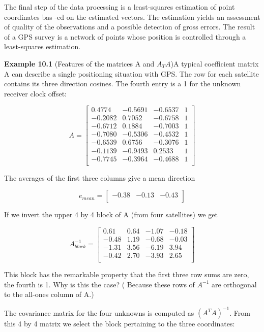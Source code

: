The final step of the data processing is a least-squares estimation of point coordinates bas
-ed on the estimated vectors. The estimation yields an assessment of quality of the observations and a possible detection of gross errors. The result of a GPS survey is a network of points whose position is controlled through a least-squares estimation.

\textbf{Example 10.1} (Features of the matrices A and $A_{T}A$)A typical coefficient matrix A can describe a single positioning situation with GPS. The row for each satellite contains its three direction cosines. The fourth entry is a 1 for the unknown receiver clock offset:

$$
A=\begin{bmatrix}
0.4774 & -0.5691 & -0.6537 & 1\\
-0.2082 & 0.7052 & -0.6758 & 1\\
-0.6712 & 0.1884 & -0.7003 & 1\\
-0.7080 & -0.5306 & -0.4532 & 1\\
-0.6539 & 0.6756 & -0.3076 & 1\\
-0.1139 & -0.9493 & 0.2533 & 1\\
-0.7745 & -0.3964 & -0.4688 & 1\\
\end{bmatrix}
$$

The averages of the first three columns give a mean direction

$$
e_{mean}=\begin{bmatrix}
-0.38 & -0.13 & -0.43\\
\end{bmatrix}
$$

If we invert the upper 4 by 4 block of A (from four satellites) we get

$$
A_{block}^{-1}=\begin{bmatrix}
0.61 & 0.64 & -1.07 & -0.18\\
-0.48 & 1.19 & -0.68 & -0.03\\
-1.31 & 3.56 & -6.19 & 3.94\\
-0.42 & 2.70 & -3.93 & 2.65\\
\end{bmatrix}
$$

This block has the remarkable property that the first three row sums are zero, the fourth is 1. Why is this the case? ( Because these rows of $A^{-1}$ are orthogonal to the all-ones column of A.)

The covariance matrix for the four unknowns is computed as $(A^{T}A)^{-1}$. From this 4 by 4 matrix we select the block pertaining to the three coordinates:


